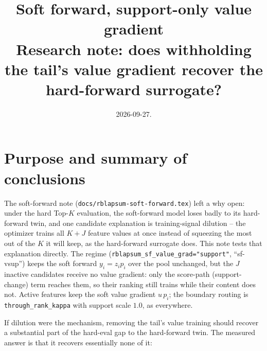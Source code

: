 \documentclass[11pt,a4paper]{article}
\title{Soft forward, support-only value gradient\\[2pt]
\large Research note: does withholding the tail's value gradient recover the
hard-forward surrogate?}
\author{}
\date{2026-09-27.}
\newcommand{\code}[1]{\texttt{#1}}
\begin{document}
\maketitle
\vspace{-2em}

\section{Purpose and summary of conclusions}

The soft-forward note (\code{docs/rblapsum-soft-forward.tex}) left a why open:
under the hard Top-$K$ evaluation, the soft-forward model loses badly to its
hard-forward twin, and one candidate explanation is training-signal dilution --
the optimizer trains all $K{+}J$ feature values at once instead of squeezing
the most out of the $K$ it will keep, as the hard-forward surrogate does. This
note tests that explanation directly. The regime
(\code{rblapsum\_sf\_value\_grad="support"}, ``sf-vsup'') keeps the soft
forward $y_i = z_i p_i$ over the pool unchanged, but the $J$ inactive
candidates receive no value gradient: only the score-path (support-change)
term reaches them, so their ranking still trains while their content does not.
Active features keep the soft value gradient $u\,p_i$; the boundary routing is
\code{through\_rank\_kappa} with support scale $1.0$, as everywhere.

If dilution were the mechanism, removing the tail's value training should
recover a substantial part of the hard-eval gap to the hard-forward twin. The
measured answer is that it recovers essentially none of it:
\end{document}
